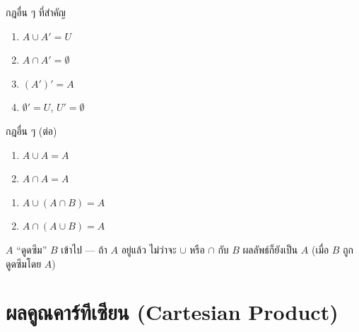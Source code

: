 \documentclass[11pt, aspectratio=169]{beamer}
\begin{document}
\begin{frame}{กฎอื่น ๆ ที่สำคัญ}
  \begin{explanation}
    \begin{enumerate}
      \item $A \cup A' = U$
      \item $A \cap A' = \emptyset$
      \item $(A')' = A$
      \item $\emptyset' = U$, \quad $U' = \emptyset$
    \end{enumerate}
  \end{explanation}
\end{frame}

\begin{frame}{กฎอื่น ๆ (ต่อ)}
  \begin{explanation}
    \begin{enumerate}
      \item $A \cup A = A$
      \item $A \cap A = A$
    \end{enumerate}
  \end{explanation}

  \begin{explanation}
    \begin{enumerate}
      \item $A \cup (A \cap B) = A$
      \item $A \cap (A \cup B) = A$
    \end{enumerate}
  \end{explanation}

  \begin{intuition}[Absorption = การดูดซึม]
    $A$ ``ดูดซึม'' $B$ เข้าไป — ถ้า $A$ อยู่แล้ว ไม่ว่าจะ $\cup$ หรือ $\cap$ กับ $B$
    ผลลัพธ์ก็ยังเป็น $A$ (เมื่อ $B$ ถูกดูดซึมโดย $A$)
  \end{intuition}
\end{frame}

\section{ผลคูณคาร์ทีเซียน (Cartesian Product)}
\end{document}
